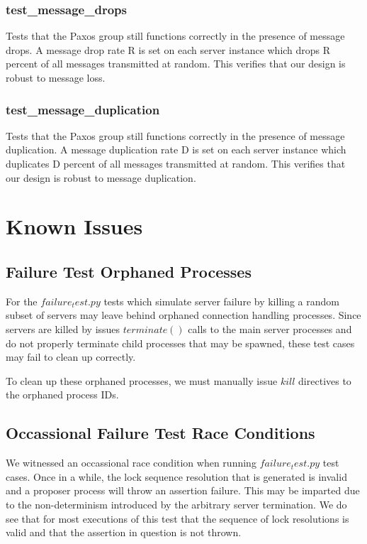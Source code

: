 \documentclass{article}
\begin{document}
\subsubsection{test\_message\_drops}

Tests that the Paxos group still functions correctly in the presence of message drops.
A message drop rate R is set on each server instance which drops R percent of all messages transmitted at random.
This verifies that our design is robust to message loss.

\subsubsection{test\_message\_duplication}

Tests that the Paxos group still functions correctly in the presence of message duplication.
A message duplication rate D is set on each server instance which duplicates D percent of all messages transmitted at random.
This verifies that our design is robust to message duplication.


\section{Known Issues}

\subsection{Failure Test Orphaned Processes}

For the $failure_test.py$ tests which simulate server failure by killing a random subset of servers may leave behind orphaned connection handling processes. 
Since servers are killed by issues $terminate()$ calls to the main server processes and do not properly terminate child processes that may be spawned, these test cases may fail to clean up correctly.

To clean up these orphaned processes, we must manually issue $kill$ directives to the orphaned process IDs.

\subsection{Occassional Failure Test Race Conditions}

We witnessed an occassional race condition when running $failure_test.py$ test cases.
Once in a while, the lock sequence resolution that is generated is invalid and a proposer process will throw an assertion failure.
This may be imparted due to the non-determinism introduced by the arbitrary server termination.
We do see that for most executions of this test that the sequence of lock resolutions is valid and that the assertion in question is not thrown.
\end{document}
